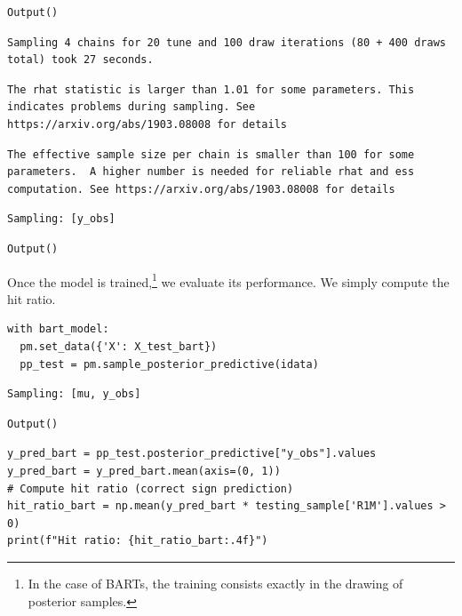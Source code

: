 \begin{verbatim}
Output()
\end{verbatim}

\begin{verbatim}
Sampling 4 chains for 20 tune and 100 draw iterations (80 + 400 draws total) took 27 seconds.
\end{verbatim}

\begin{verbatim}
The rhat statistic is larger than 1.01 for some parameters. This indicates problems during sampling. See https://arxiv.org/abs/1903.08008 for details
\end{verbatim}

\begin{verbatim}
The effective sample size per chain is smaller than 100 for some parameters.  A higher number is needed for reliable rhat and ess computation. See https://arxiv.org/abs/1903.08008 for details
\end{verbatim}

\begin{verbatim}
Sampling: [y_obs]
\end{verbatim}

\begin{verbatim}
Output()
\end{verbatim}

Once the model is trained,\footnote{In the case of BARTs, the training consists exactly in the drawing of posterior samples.} we evaluate its performance. We simply compute the hit ratio.

\begin{verbatim}
with bart_model:                                                                                  
  pm.set_data({'X': X_test_bart})   
  pp_test = pm.sample_posterior_predictive(idata)
\end{verbatim}

\begin{verbatim}
Sampling: [mu, y_obs]
\end{verbatim}

\begin{verbatim}
Output()
\end{verbatim}

\begin{verbatim}
y_pred_bart = pp_test.posterior_predictive["y_obs"].values
y_pred_bart = y_pred_bart.mean(axis=(0, 1)) 
# Compute hit ratio (correct sign prediction)
hit_ratio_bart = np.mean(y_pred_bart * testing_sample['R1M'].values > 0)
print(f"Hit ratio: {hit_ratio_bart:.4f}")
\end{verbatim}

